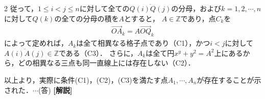 \documentclass[../../../../main.tex]{subfiles}
\begin{document}
\begin{multicols}{2}
  従って，$1 \le i<j \le n$に対して全ての$\overline{Q(i)Q(j)}$の分母，および$k=1,2,\cdots, n$に対して$Q(k)$の全ての分母の積を$A$とすると，
  $A\in\mathbb{Z}$であり，点$C_{k}$を
  \begin{align*}
    \vec{OA}_{k} = A\vec{OQ}_{k}
  \end{align*}
  によって定めれば，$A_{k}$は全て相異なる格子点であり（C1），かつ$i<j$に対して$\overline{A(i)A(j)}\in\mathbb{Z}$である（C3）．
  さらに，$A_{k}$は全て円$x^y+y^2=A^2$上にあるから，どの相異なる三点も同一直線上には存在しない（C2）．

  以上より，実際に条件(C1)，(C2)，(C3)を満たす点$A_1,\cdots,A_n$が存在することが示された．$\cdots$(答)
  \vspace{10pt}
  {\bf[解説]}

  \newpage
\end{multicols}
\end{document}
